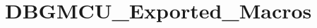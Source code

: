 \hypertarget{group___d_b_g_m_c_u___exported___macros}{}\section{D\+B\+G\+M\+C\+U\+\_\+\+Exported\+\_\+\+Macros}
\label{group___d_b_g_m_c_u___exported___macros}
